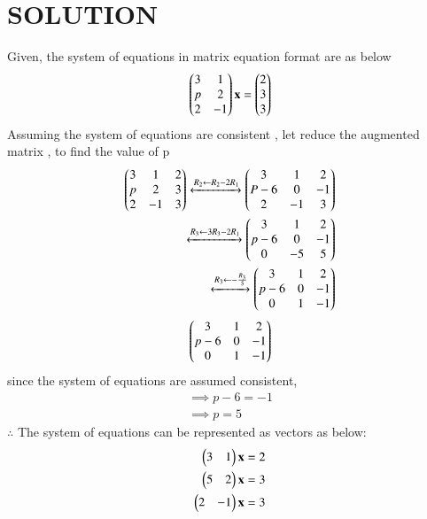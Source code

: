 \documentclass[journal,12pt,twocolumn]{IEEEtran}
\begin{document}
\section{SOLUTION}  
Given, the system of equations in matrix equation format are as below
\begin{align}
\begin{pmatrix}3 & 1\\p & 2\\2 & -1\end{pmatrix} \mathbf{x} = \begin{pmatrix}2\\3\\3\end{pmatrix}
\end{align}
%
Assuming the system of equations are consistent , let reduce the augmented matrix , to find the value of p
\begin{align}
    \begin{pmatrix}3 & 1 & 2\\p & 2 & 3\\2 &-1 & 3\end{pmatrix} 
\xleftrightarrow {R_2\leftarrow R_2 -2 R_1} \begin{pmatrix}3& 1 & 2\\P-6 & 0 & -1\\2 & -1 &3\end{pmatrix} 
\\
\xleftrightarrow {R_3\leftarrow 3R_3 -2 R_1}\begin{pmatrix}3 & 1 & 2 \\p-6 & 0 & -1\\0 & -5 & 5\end{pmatrix}
\\
\xleftrightarrow {R_3\leftarrow -\frac{R_3}{5}}\begin{pmatrix}3 & 1 & 2 \\p-6 & 0 & -1\\0 & 1& -1\end{pmatrix}
\end{align}
\begin{align}
\begin{pmatrix}3 & 1 & 2\\p-6 & 0 & -1\\0 & 1 & -1\end{pmatrix} 
\end{align}
%
since the system of equations are assumed consistent, 
%
\begin{align}
\implies p-6 = -1
\\
\implies p = 5
\end{align}
$\therefore$ The system of equations can be represented as vectors as below:
\begin{align}
 \begin{pmatrix}3 & 1\end{pmatrix}\mathbf{x}&=2 
\\
 \begin{pmatrix}5 & 2 \end{pmatrix}\mathbf{x}&=3 
\\
 \begin{pmatrix}2 & -1\end{pmatrix}\mathbf{x}&=3    
\end{align}
\end{document}
